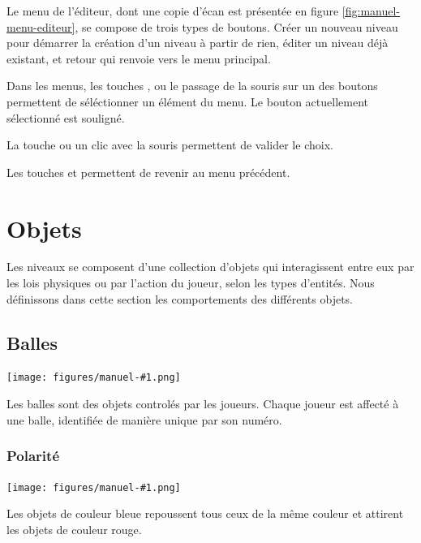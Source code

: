 Le menu de l'éditeur, dont une copie d'écan est présentée en figure
\ref{fig:manuel-menu-editeur}, se compose de trois types de boutons.
Créer un nouveau niveau pour démarrer la création d'un niveau à partir
de rien, éditer un niveau déjà existant, et retour qui renvoie vers
le menu principal.

Dans les menus, les touches \fbox{$\uparrow$}, \fbox{$\downarrow$} ou
le passage de la souris sur un des boutons permettent de séléctionner un
élément du menu. Le bouton actuellement sélectionné est souligné.

La touche  ou un clic avec la souris permettent de valider le choix.

Les touches \fbox{$\longleftarrow$} et  permettent de revenir
au menu précédent.

\section{Objets}
\label{sec:manuel-objets}
\newcommand{\objectsymbol}[1]{
    \texttt{[image: figures/manuel-\#1.png]}
}

\newcommand{\describeobject}[2]{
    \noindent
    \begin{minipage}{.08\textwidth}
        \objectsymbol{#1}
    \end{minipage}
    \begin{minipage}{.9\textwidth}
        #2
    \end{minipage}
}

Les niveaux se composent d'une collection d'objets qui
interagissent entre eux par les lois physiques ou par
l'action du joueur, selon les types d'entités. Nous
définissons dans cette section les comportements
des différents objets.

\subsection{Balles}

\describeobject{ball}{
    Les balles sont des objets controlés par les joueurs. Chaque joueur
    est affecté à une balle, identifiée de manière unique par son numéro.
}

\subsubsection{Polarité}

\describeobject{charge-neg}{
    Les objets de couleur bleue repoussent tous ceux de la même couleur
    et attirent les objets de couleur rouge.
}

